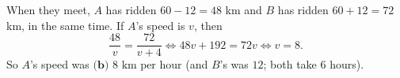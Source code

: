 When they meet, $A$ has ridden $60-12=48$ km and $B$ has ridden $60+12=72$ km, in the same time. If $A$'s speed is $v$, then
\[
\dfrac{48}{v}=\dfrac{72}{v+4}\iff 48v+192=72v\iff v=8 .
\]
So $A$'s speed was $\boxed{\textbf{(b) }8\text{ km per hour}}$ (and $B$'s was $12$; both take $6$ hours).
